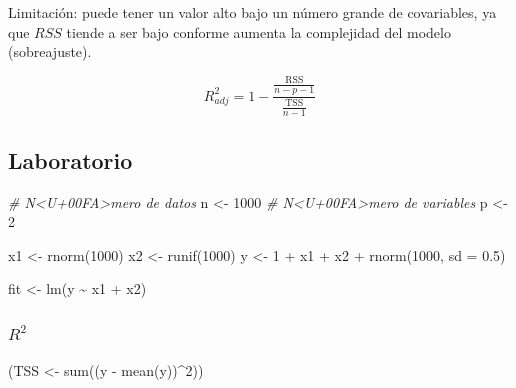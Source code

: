 \documentclass[
  12pt,
]{book}
\newenvironment{Shaded}{\begin{snugshade}}{\end{snugshade}}
\newcommand{\AttributeTok}[1]{\textcolor[rgb]{0.77,0.63,0.00}{#1}}
\newcommand{\CommentTok}[1]{\textcolor[rgb]{0.56,0.35,0.01}{\textit{#1}}}
\newcommand{\DecValTok}[1]{\textcolor[rgb]{0.00,0.00,0.81}{#1}}
\newcommand{\FloatTok}[1]{\textcolor[rgb]{0.00,0.00,0.81}{#1}}
\newcommand{\FunctionTok}[1]{\textcolor[rgb]{0.00,0.00,0.00}{#1}}
\newcommand{\NormalTok}[1]{#1}
\newcommand{\OtherTok}[1]{\textcolor[rgb]{0.56,0.35,0.01}{#1}}
\newcommand{\SpecialCharTok}[1]{\textcolor[rgb]{0.00,0.00,0.00}{#1}}
\providecommand{\tightlist}{%
  \setlength{\itemsep}{0pt}\setlength{\parskip}{0pt}}
\begin{document}
Limitación: puede tener un valor alto bajo un número grande de
covariables, ya que \(RSS\) tiende a ser bajo conforme aumenta la
complejidad del modelo (sobreajuste).

\begin{description}
\tightlist
\item[Estadístico \(R^{2}\) ajustado]
\begin{equation*}
R^{2}_{adj} = 1-\frac{\frac{\mathrm{RSS}}{n-p-1}}{\frac{\mathrm{TSS}}{n-1}}
\end{equation*}
\end{description}

\hypertarget{laboratorio-3}{%
\subsection{Laboratorio}\label{laboratorio-3}}

\begin{Shaded}
\begin{Highlighting}[]
\CommentTok{\# N\textless{}U+00FA\textgreater{}mero de datos}
\NormalTok{n }\OtherTok{\textless{}{-}} \DecValTok{1000}
\CommentTok{\# N\textless{}U+00FA\textgreater{}mero de variables}
\NormalTok{p }\OtherTok{\textless{}{-}} \DecValTok{2}

\NormalTok{x1 }\OtherTok{\textless{}{-}} \FunctionTok{rnorm}\NormalTok{(}\DecValTok{1000}\NormalTok{)}
\NormalTok{x2 }\OtherTok{\textless{}{-}} \FunctionTok{runif}\NormalTok{(}\DecValTok{1000}\NormalTok{)}
\NormalTok{y }\OtherTok{\textless{}{-}} \DecValTok{1} \SpecialCharTok{+}\NormalTok{ x1 }\SpecialCharTok{+}\NormalTok{ x2 }\SpecialCharTok{+} \FunctionTok{rnorm}\NormalTok{(}\DecValTok{1000}\NormalTok{, }\AttributeTok{sd =} \FloatTok{0.5}\NormalTok{)}

\NormalTok{fit }\OtherTok{\textless{}{-}} \FunctionTok{lm}\NormalTok{(y }\SpecialCharTok{\textasciitilde{}}\NormalTok{ x1 }\SpecialCharTok{+}\NormalTok{ x2)}
\end{Highlighting}
\end{Shaded}

\hypertarget{r2}{%
\subsubsection{\texorpdfstring{\(R^2\)}{R\^{}2}}\label{r2}}

\begin{Shaded}
\begin{Highlighting}[]
\NormalTok{(TSS }\OtherTok{\textless{}{-}} \FunctionTok{sum}\NormalTok{((y }\SpecialCharTok{{-}} \FunctionTok{mean}\NormalTok{(y))}\SpecialCharTok{\^{}}\DecValTok{2}\NormalTok{))}
\end{Highlighting}
\end{Shaded}
\end{document}
